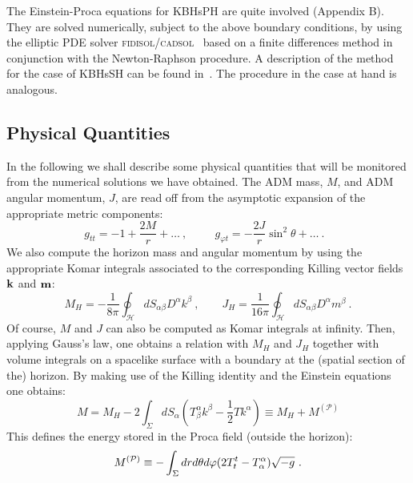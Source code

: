 The Einstein-Proca equations for KBHsPH are quite involved (Appendix B). They are solved numerically, subject to the above boundary conditions, by  using the elliptic PDE solver \textsc{fidisol/cadsol}~\cite{schoen} 
based on a finite differences method in conjunction with the Newton-Raphson procedure. 
A description of the method for the case of KBHsSH can be found in~\cite{Herdeiro:2015gia}. 
The procedure in the case at hand is analogous. 

 


\subsection{Physical Quantities}
\label{subsec_II}
In the following we shall describe some physical quantities that will be monitored from the numerical solutions we have obtained.  The ADM mass, $M$, and ADM angular momentum, $J$, are read off from the asymptotic expansion of the appropriate metric components:
%
\begin{equation}
\label{asym}
g_{tt} =-1+\frac{2M}{r}+\dots \ ,\qquad ~~g_{\varphi t}=-\frac{2J}{r}\sin^2\theta+\dots \ . \ \ \ 
\end{equation}
%
We also compute the horizon mass and angular momentum by using the appropriate Komar integrals associated to the corresponding Killing vector fields ${\bf k}$ and ${\bf m}$:
\begin{equation}
M_H=-\frac{1}{8\pi}\oint_{\mathcal{H}}dS_{\alpha\beta}D^\alpha k^\beta \ , \qquad 
J_H=\frac{1}{16\pi}\oint_{\mathcal{H}}dS_{\alpha\beta}D^\alpha m^\beta \ .
\end{equation}
%
%
Of course, $M$ and $J$ can also be computed as Komar integrals at infinity. Then, applying Gauss's law, one obtains a relation with $M_H$ and $J_H$ together with volume integrals on a spacelike surface with a boundary at the (spatial section of the) horizon. By making use of the Killing identity and the Einstein equations one obtains:
\begin{equation}
M=M_H-2\int_{\Sigma}dS_{\alpha}\left(T^\alpha_\beta k^\beta-\frac{1}{2}Tk^\alpha\right) \equiv M_H+M^{(\mathcal{P})}
\end{equation}
This defines the energy stored in the Proca field (outside the horizon):
\begin{equation}
M^{({\cal P})}\equiv - \int_{\Sigma} dr d\theta d\varphi(2T_t^t-T_\alpha^\alpha) \sqrt{-g} \ .
\label{ed}
\end{equation}

